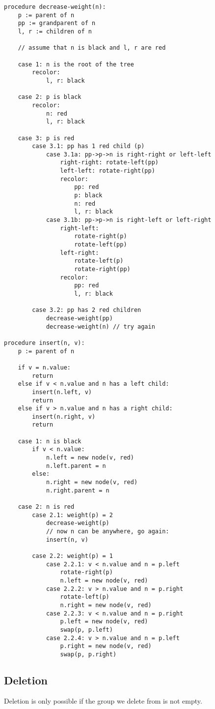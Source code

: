 \documentclass{article}
\begin{document}
\begin{small}
\begin{verbatim}
procedure decrease-weight(n):
    p := parent of n
    pp := grandparent of n
    l, r := children of n

    // assume that n is black and l, r are red

    case 1: n is the root of the tree
        recolor:
            l, r: black

    case 2: p is black
        recolor:
            n: red
            l, r: black

    case 3: p is red
        case 3.1: pp has 1 red child (p)
            case 3.1a: pp->p->n is right-right or left-left
                right-right: rotate-left(pp)
                left-left: rotate-right(pp)
                recolor:
                    pp: red
                    p: black
                    n: red
                    l, r: black
            case 3.1b: pp->p->n is right-left or left-right
                right-left:
                    rotate-right(p)
                    rotate-left(pp)
                left-right:
                    rotate-left(p)
                    rotate-right(pp)
                recolor:
                    pp: red
                    l, r: black

        case 3.2: pp has 2 red children
            decrease-weight(pp)
            decrease-weight(n) // try again

procedure insert(n, v):
    p := parent of n

    if v = n.value:
        return
    else if v < n.value and n has a left child:
        insert(n.left, v)
        return
    else if v > n.value and n has a right child:
        insert(n.right, v)
        return

    case 1: n is black
        if v < n.value:
            n.left = new node(v, red)
            n.left.parent = n
        else:
            n.right = new node(v, red)
            n.right.parent = n

    case 2: n is red
        case 2.1: weight(p) = 2
            decrease-weight(p)
            // now n can be anywhere, go again:
            insert(n, v)

        case 2.2: weight(p) = 1
            case 2.2.1: v < n.value and n = p.left
                rotate-right(p)
                n.left = new node(v, red)
            case 2.2.2: v > n.value and n = p.right
                rotate-left(p)
                n.right = new node(v, red)
            case 2.2.3: v < n.value and n = p.right
                p.left = new node(v, red)
                swap(p, p.left)
            case 2.2.4: v > n.value and n = p.left
                p.right = new node(v, red)
                swap(p, p.right)
\end{verbatim}
\end{small}

\subsection{Deletion}
Deletion is only possible if the group we delete from is not empty.
\end{document}
